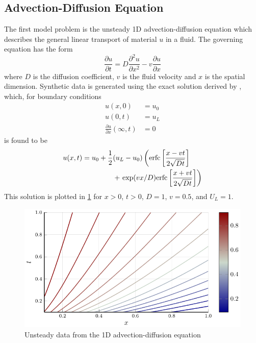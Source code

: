 \documentclass{article}
\begin{document}
\subsection{Advection-Diffusion Equation}

The first model problem is the unsteady 1D advection-diffusion equation which describes the general linear transport of material $u$ in a fluid. The governing equation has the form 
\begin{equation} 
\frac{\partial u}{\partial t} = D\frac{\partial^2 u}{\partial x^2} - v \frac{\partial u}{\partial x}
\end{equation}
where $D$ is the diffusion coefficient, $v$ is the fluid velocity and $x$ is the spatial dimension. Synthetic data is generated using the exact solution derived by \citet{van1982analytical}, which, for boundary conditions 
\begin{align}
  u(x,0) &= u_0 \\
  u(0,t) &= u_L \\
  \frac{\partial u}{\partial x}(\infty, t) &= 0
\end{align}
is found to be 
\begin{equation}
  \begin{split}
  u(x,t) = u_0 + \frac{1}{2}&(u_L - u_0) \left({\rm erfc}\left[ \frac{x - vt}{2\sqrt{Dt}}\right]\right. \\
  &+ \left.{\rm exp}(vx/D) {\rm erfc}\left[ \frac{x + vt}{2\sqrt{Dt}}\right] \right)
  \end{split}
\end{equation}
This solution is plotted in \cref{fig:advdif} for $x>0$, $t>0$, $D=1$, $v=0.5$, and $U_L = 1$.

\begin{figure}
\vskip 0.2in
\begin{center}
\centerline{\includegraphics[width=\columnwidth]{./figures/advdif}}
\caption{Unsteady data from the 1D advection-diffusion equation}
\label{fig:advdif}
\end{center}
\vskip -0.2in
\end{figure}
\end{document}
